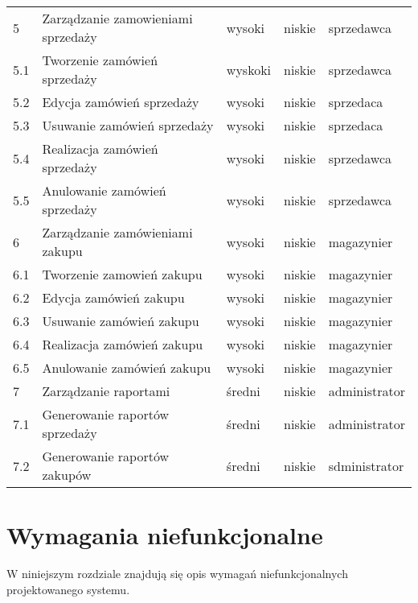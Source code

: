 \begin{table}[ht]
\begin{center}
\begin{tabular}{| l | l | l | l | l |}
		   	\hline
		   	5 & Zarządzanie zamowieniami sprzedaży & wysoki & niskie & sprzedawca \\
		   	5.1 & Tworzenie zamówień sprzedaży & wyskoki & niskie & sprzedawca \\
		   	5.2 & Edycja zamówień sprzedaży & wysoki & niskie & sprzedaca \\
		   	5.3 & Usuwanie zamówień sprzedaży & wysoki & niskie & sprzedaca \\
		   	5.4 & Realizacja zamówień sprzedaży & wysoki & niskie & sprzedawca \\
		   	5.5 & Anulowanie zamówień sprzedaży & wysoki & niskie & sprzedawca \\
		   	\hline
		   	6 & Zarządzanie zamówieniami zakupu & wysoki & niskie & magazynier \\
		   	6.1 & Tworzenie zamowień zakupu & wysoki & niskie & magazynier \\
		   	6.2 & Edycja zamówień zakupu & wysoki & niskie & magazynier \\
		   	6.3 & Usuwanie zamówień zakupu & wysoki & niskie & magazynier \\
		   	6.4 & Realizacja zamówień zakupu & wysoki & niskie & magazynier \\
		   	6.5 & Anulowanie zamówień zakupu & wysoki & niskie & magazynier \\
		   	\hline
		   	7 & Zarządzanie raportami & średni & niskie & administrator \\
		   	7.1 & Generowanie raportów sprzedaży & średni & niskie & administrator \\
		   	7.2 & Generowanie raportów zakupów & średni & niskie & sdministrator \\
		   	\hline
		   	\hline
	    \end{tabular}
	\end{center}
\end{table}
\FloatBarrier

\section{Wymagania niefunkcjonalne}

W niniejszym rozdziale znajdują się opis wymagań niefunkcjonalnych
projektowanego systemu.

